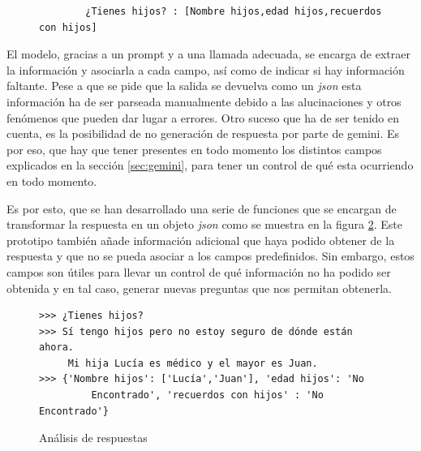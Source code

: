 \begin{figure}[h]
	\centering
	\begin{verbatim}
		¿Tienes hijos? : [Nombre hijos,edad hijos,recuerdos con hijos]
	\end{verbatim}
	\label{fig:ejemploPreguntaPredefinida}
\end{figure}

El modelo, gracias a un prompt y a una llamada adecuada, se encarga de extraer la información y asociarla a cada campo, así como de indicar si hay información faltante. Pese a que se pide que la salida se devuelva como un \textit{json} esta información ha de ser parseada manualmente debido a las alucinaciones y otros fenómenos que pueden dar lugar a errores. Otro suceso que ha de ser tenido en cuenta, es la posibilidad de no generación de respuesta por parte de gemini. Es por eso, que hay que tener presentes en todo momento los distintos campos explicados en la sección \ref{sec:gemini}, para tener un control de qué esta ocurriendo en todo momento. 

Es por esto, que se han desarrollado una serie de funciones que se encargan de transformar la respuesta en un objeto \textit{json} como se muestra en la figura \ref{fig:analisisRespuesta}. Este prototipo también añade información adicional que haya podido obtener de la respuesta y que no se pueda asociar a los campos predefinidos. Sin embargo, estos campos son útiles para llevar un control de qué información no ha podido ser obtenida y en tal caso, generar nuevas preguntas que nos permitan obtenerla. 

\begin{figure}[h]
	\centering
	\begin{verbatim}
>>>	¿Tienes hijos?
>>> Sí tengo hijos pero no estoy seguro de dónde están ahora.
     Mi hija Lucía es médico y el mayor es Juan.
>>> {'Nombre hijos': ['Lucía','Juan'], 'edad hijos': 'No
    	 Encontrado', 'recuerdos con hijos' : 'No Encontrado'}
	\end{verbatim}
	\caption{Análisis de respuestas}
	\label{fig:analisisRespuesta}
\end{figure}
 
